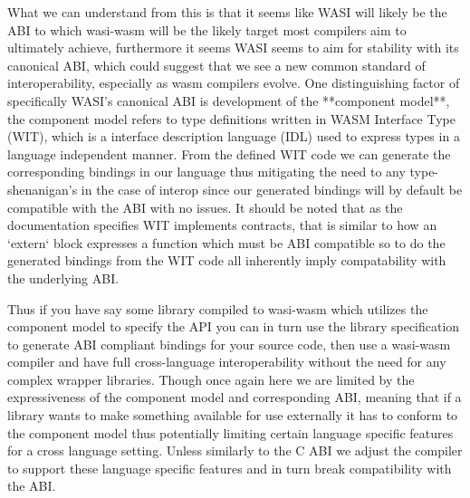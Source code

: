 What we can understand from this is that it seems like WASI will likely be the ABI to which wasi-wasm will be the likely target most compilers aim to ultimately achieve, furthermore it seems WASI seems to aim for stability with its canonical ABI, which could suggest that we see a new common standard of interoperability, especially as wasm compilers evolve. One distinguishing factor of specifically WASI's canonical ABI is development of the **component model**, the component model refers to type definitions written in WASM Interface Type (WIT), which is a interface description language (IDL) used to express types in a language independent manner. From the defined WIT code we can generate the corresponding bindings in our language thus mitigating the need to any type-shenanigan's in the case of interop since our generated bindings will by default be compatible with the ABI with no issues. It should be noted that as the documentation specifies WIT implements contracts, that is similar to how an `extern` block expresses a function which must be ABI compatible so to do the generated bindings from the WIT code all inherently imply compatability with the underlying ABI. 

Thus if you have say some library compiled to wasi-wasm which utilizes the component model to specify the API you can in turn use the library specification to generate ABI compliant bindings for your source code, then use a wasi-wasm compiler and have full cross-language interoperability without the need for any complex wrapper libraries. Though once again here we are limited by the expressiveness of the component model and corresponding ABI, meaning that if a library wants to make something available for use externally it has to conform to the component model thus potentially limiting certain language specific features for a cross language setting. Unless similarly to the C ABI we adjust the compiler to support these language specific features and in turn break compatibility with the ABI. 